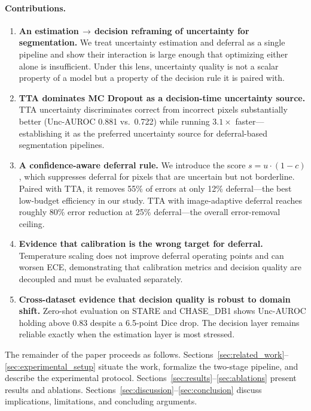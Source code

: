 \paragraph{Contributions.}
\begin{enumerate}[leftmargin=*]
  \item \textbf{An estimation$\,\to\,$decision reframing of uncertainty
  for segmentation.} We treat uncertainty estimation and deferral as a
  single pipeline and show their interaction is large enough that
  optimizing either alone is insufficient. Under this lens, uncertainty
  quality is not a scalar property of a model but a property of the
  decision rule it is paired with.

  \item \textbf{TTA dominates MC Dropout as a decision-time uncertainty
  source.} TTA uncertainty discriminates correct from incorrect pixels
  substantially better (Unc-AUROC 0.881 vs.\ 0.722) while running
  $3.1\times$ faster---establishing it as the preferred uncertainty source
  for deferral-based segmentation pipelines.

  \item \textbf{A confidence-aware deferral rule.} We introduce the score
  $s = u \cdot (1 - c)$, which suppresses deferral for pixels that are
  uncertain but not borderline. Paired with TTA, it removes 55\% of errors
  at only 12\% deferral---the best low-budget efficiency in our study. TTA
  with image-adaptive deferral reaches roughly 80\% error reduction at
  25\% deferral---the overall error-removal ceiling.

  \item \textbf{Evidence that calibration is the wrong target for
  deferral.} Temperature scaling does not improve deferral operating
  points and can worsen ECE, demonstrating that calibration metrics and
  decision quality are decoupled and must be evaluated separately.

  \item \textbf{Cross-dataset evidence that decision quality is robust to
  domain shift.} Zero-shot evaluation on STARE and CHASE\_DB1 shows
  Unc-AUROC holding above 0.83 despite a 6.5-point Dice drop. The decision
  layer remains reliable exactly when the estimation layer is most stressed.
\end{enumerate}

The remainder of the paper proceeds as follows.
Sections~\ref{sec:related_work}--\ref{sec:experimental_setup} situate the
work, formalize the two-stage pipeline, and describe the experimental
protocol. Sections~\ref{sec:results}--\ref{sec:ablations} present results
and ablations. Sections~\ref{sec:discussion}--\ref{sec:conclusion} discuss
implications, limitations, and concluding arguments.
